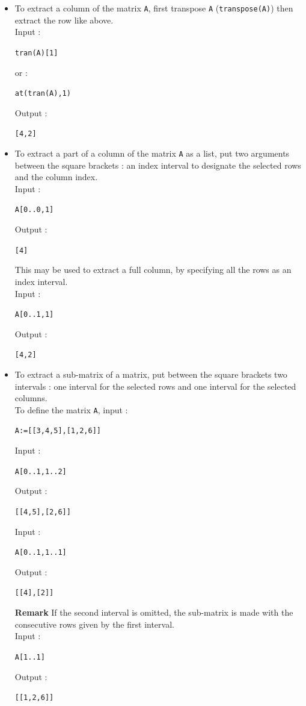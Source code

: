 \documentclass[a4paper,11pt]{book}
\begin{document}
\begin{itemize}
\item To extract a column of the matrix {\tt A}, first transpose
{\tt A} ({\tt transpose(A)}) then extract the row like above.\\
Input :
\begin{center}{\tt tran(A)[1]}\end{center}
or :
\begin{center}{\tt at(tran(A),1)}\end{center}
Output :
\begin{center}{\tt [4,2]}\end{center}

\item  To extract a part of a column of the matrix {\tt A} 
as a list, put two arguments 
between the square brackets : an index interval to 
designate the selected rows and the column index.\\
Input :
\begin{center}{\tt A[0..0,1]}\end{center}
Output :
\begin{center}{\tt [4]}\end{center}

This may be used to extract a full column, by specifying all the rows
as an index interval.\\
Input :
\begin{center}{\tt A[0..1,1]}\end{center}
Output :
\begin{center}{\tt [4,2]}\end{center}

\item
To extract a sub-matrix of a matrix, put between the square brackets two 
intervals : one interval for the selected rows and one interval for the 
selected columns.\\
To define the matrix {\tt A}, input :
\begin{center}{\tt A:=[[3,4,5],[1,2,6]]}\end{center}
Input :
\begin{center}{\tt A[0..1,1..2]}\end{center}
Output :
\begin{center}{\tt [[4,5],[2,6]]}\end{center}
Input :
\begin{center}{\tt A[0..1,1..1]}\end{center}
Output :
\begin{center}{\tt [[4],[2]]}\end{center}
{\bf Remark}
If the second interval is omitted, the sub-matrix is made with the consecutive 
rows given by the first interval.\\ 
Input :
\begin{center}{\tt A[1..1]}\end{center}
Output :
\begin{center}{\tt [[1,2,6]]}\end{center}
\end{itemize}
\end{document}
